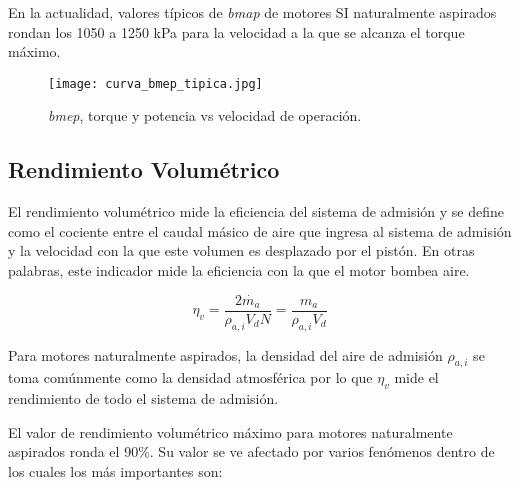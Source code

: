 En la actualidad, valores típicos de \emph{bmap} de motores SI naturalmente
aspirados rondan los 1050 a 1250 kPa para la velocidad a la que se alcanza el
torque máximo.

\begin{figure} \centering
\texttt{[image: curva\_bmep\_tipica.jpg]}
    \caption{\emph{bmep}, torque y potencia vs velocidad de
operación\parencite{heywood}.}
    \label{fig:bmep_tipica}
\end{figure}


\subsection{Rendimiento Volumétrico}
%
El rendimiento volumétrico mide la eficiencia del sistema de admisión y se
define como el cociente entre el caudal másico de aire que ingresa al sistema de
admisión y la velocidad con la que este volumen es desplazado por el pistón.
%
En otras palabras, este indicador mide la eficiencia con la que el motor bombea
aire.

\begin{equation}\label{eq:eta_v} \eta_v = \frac{2\dot{m_a}}{\rho_{a,i}V_d N} = \frac{m_a}{\rho_{a,i}V_d}
\end{equation}

Para motores naturalmente aspirados, la densidad del aire de admisión
$\rho_{a,i}$ se toma comúnmente como la densidad atmosférica por lo que $\eta_v$
mide el rendimiento de todo el sistema de admisión.

El valor de rendimiento volumétrico máximo para motores naturalmente aspirados
ronda el 90\%.
%
Su valor se ve afectado por varios fenómenos dentro de los cuales los más
importantes son:

